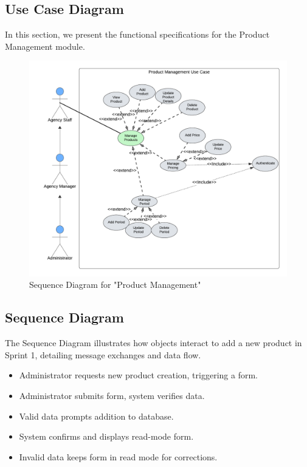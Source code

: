 \subsection{Use Case Diagram}

In this section, we present the functional specifications for the Product Management module.\\

\begin{figure}[h]
    \centering
    \includegraphics[width=1\textwidth]{sprint1/sprint1usecase.png}
    \caption{Sequence Diagram for "Product Management"}
    \label{fig:product_management_use_case}
\end{figure}

\subsection{Sequence Diagram}
The Sequence Diagram \cite{sequencediagram} illustrates how objects interact to add a new product in Sprint 1, detailing message exchanges and data flow.

\begin{itemize}
    \item Administrator requests new product creation, triggering a form.
    \item Administrator submits form, system verifies data.
    \item Valid data prompts addition to database.
    \item System confirms and displays read-mode form.
    \item Invalid data keeps form in read mode for corrections.
\end{itemize}


